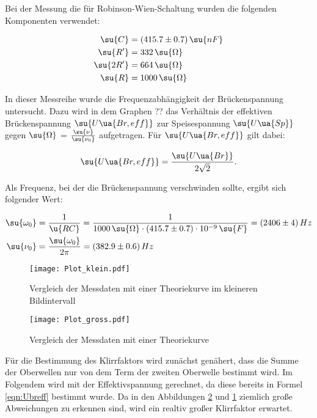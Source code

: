Bei der Messung die für Robinson-Wien-Schaltung wurden die folgenden Komponenten
verwendet:

\begin{align}
  \su{C}   &=  (415.7 \pm 0.7) \, \su{nF}  \\
  \su{R'}  &= 332 \, \su{\Omega}          \\
  \su{2R'} &= 664 \, \su{\Omega}         \\
  \su{R}   &= 1000 \, \su{\Omega}
\end{align}

In dieser Messreihe wurde die Frequenzabhängigkeit der Brückenspannung untersucht.
Dazu wird in dem Graphen ?? das Verhältnis der effektiven Brückenspannung $\su{U\ua{Br,eff}}$
zur Speisespannung $\su{U\ua{Sp}}$ gegen $\su{\Omega}$ = $\frac{\su{\nu}}{\su{\nu_0}}$
aufgetragen. Für $\su{U\ua{Br,eff}}$ gilt dabei:

\begin{equation}
  \su{U\ua{Br,eff}} = \frac{\su{U\ua{Br}}}{2\sqrt{2}}.
  \label{eqn:Ubreff}
\end{equation}

Als Frequenz, bei der die Brückenspannung verschwinden sollte, ergibt sich folgender
Wert:

\begin{align}
  \su{\omega_0} &= \frac{1}{\u{RC}} = \frac{1}{1000 \, \su{\Omega} \cdot (415.7 \pm 0.7) \cdot 10^{-9} \, \su{F}} = (2406 \pm 4) \, Hz \\
  \su{\nu_0}    &= \frac{\su{\omega_0}}{2\pi} = (382.9 \pm 0.6) \, Hz
\end{align}

\begin{figure}
  \centering
  \texttt{[image: Plot\_klein.pdf]}
  \caption{Vergleich der Messdaten mit einer Theoriekurve im kleineren Bildintervall}
  \label{Plotgeschnitten}
\end{figure}

\begin{figure}
  \centering
  \texttt{[image: Plot\_gross.pdf]}
  \caption{Vergleich der Messdaten mit einer Theoriekurve}
  \label{Plotkomplett}
\end{figure}

Für die Bestimmung des Klirrfaktors wird zunächst genähert, dass die Summe der
Oberwellen nur von dem Term der zweiten Oberwelle bestimmt wird. Im Folgendem
wird mit der Effektivspannung gerechnet, da diese bereits in Formel \eqref{eqn:Ubreff}
bestimmt wurde. Da in den Abbildungen \ref{Plotkomplett} und \ref{Plotgeschnitten}
ziemlich große Abweichungen zu erkennen sind, wird ein realtiv großer Klirrfaktor
erwartet.

